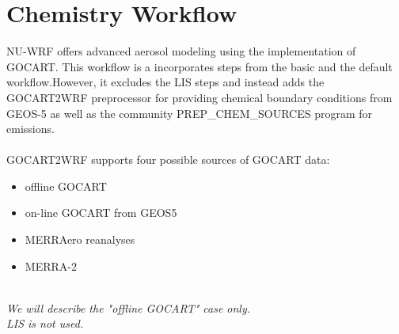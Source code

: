 \section{Chemistry Workflow}

\begin{frame}

NU-WRF offers advanced aerosol modeling using the implementation of GOCART. This workflow is a incorporates steps from the  basic and the default workflow.However, it excludes the LIS steps and instead adds the GOCART2WRF preprocessor for providing chemical boundary conditions from GEOS-5 as well as the community PREP\_CHEM\_SOURCES program for emissions.  \\
\mbox{}\\
GOCART2WRF supports four possible sources of GOCART data:
\begin{itemize}
\item offline GOCART
\item on-line GOCART from GEOS5
\item MERRAero reanalyses
\item MERRA-2
\end{itemize}
\mbox{}\\
\emph{We will describe the "offline GOCART" case only.\\
LIS is not used.}
\mbox{}\\

\end{frame}

